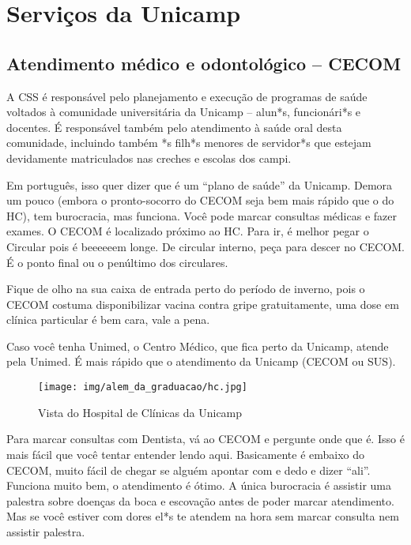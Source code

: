 
\section{Serviços da Unicamp}
\subsection{Atendimento médico e odontológico -- CECOM}

A CSS é responsável pelo planejamento e execução de programas de saúde voltados
à comunidade universitária da Unicamp -- alun*s, funcionári*s e docentes. É
responsável também pelo atendimento à saúde oral desta comunidade, incluindo
também *s filh*s menores de servidor*s que estejam devidamente matriculados nas
creches e escolas dos campi.

Em português, isso quer dizer que é um ``plano de saúde'' da Unicamp. Demora um
pouco (embora o pronto-socorro do CECOM seja bem mais rápido que o do HC), tem
burocracia, mas funciona. Você pode marcar consultas médicas e fazer exames. O
CECOM é localizado próximo ao HC. Para ir, é melhor pegar o Circular pois é
beeeeeem longe. De circular interno, peça para descer no CECOM. É o ponto final
ou o penúltimo dos circulares.

Fique de olho na sua caixa de entrada perto do período de inverno, pois o CECOM
costuma disponibilizar vacina contra gripe gratuitamente, uma dose em clínica
particular é bem cara, vale a pena.

Caso você tenha Unimed, o Centro Médico, que fica perto da Unicamp, atende pela
Unimed. É mais rápido que o atendimento da Unicamp (CECOM ou SUS).

\begin{figure}[h!]
    \centering
    \texttt{[image: img/alem\_da\_graduacao/hc.jpg]}
    \caption{Vista do Hospital de Clínicas da Unicamp}
\end{figure}

Para marcar consultas com Dentista, vá ao CECOM e pergunte onde que é. Isso é
mais fácil que você tentar entender lendo aqui. Basicamente é embaixo do CECOM,
muito fácil de chegar se alguém apontar com e dedo e dizer ``ali''. Funciona
muito bem, o atendimento é ótimo. A única burocracia é assistir uma palestra
sobre doenças da boca e escovação antes de poder marcar atendimento. Mas se
você estiver com dores el*s te atendem na hora sem marcar consulta nem assistir
palestra.

